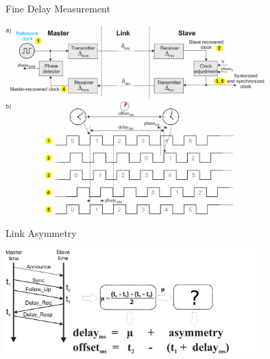 \documentclass[compress,red]{beamer}
\begin{document}
\subsection{}
\begin{frame}{Fine Delay Measurement}

  \begin{center}
  \includegraphics[width=10.0cm]{protocol/link_model.pdf}
  \end{center}

\end{frame}
\begin{frame}{Link Asymmetry}

  \begin{center}
  \includegraphics[height=4cm]{protocol/wrLinkModel_init.pdf}
  \end{center}

\end{frame}
\end{document}
